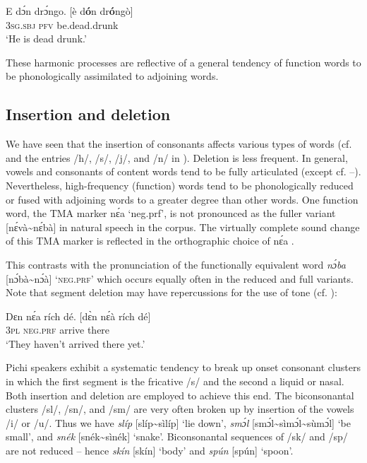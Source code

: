 \ea%
    \label{ex:key:37}
    \gll   E    dɔ́n    drɔ́ngo.          [è d\textbf{ó}n dr\textbf{ó}ngò]\\
\textsc{3sg.sbj}  \textsc{pfv}    be.dead.drunk\\

\glt ‘He is dead drunk.’
\z

These harmonic processes are reflective of a general tendency of function words to be phonologically assimilated to adjoining words. 

\subsection{Insertion and deletion}\label{sec:2.5.4}

We have seen that the insertion of consonants affects various types of words (cf.  and the entries /h/, /s/, /j/, and /n/ in ). Deletion is less frequent. In general, vowels and consonants of content words tend to be fully articulated (except cf. –). Nevertheless, high-frequency (function) words tend to be phonologically reduced or fused with adjoining words to a greater degree than other words. One function word, the TMA marker nɛ́a ‘neg.prf’, is not pronounced as the fuller variant [nɛ́và{\textasciitilde}nɛ́bà] in natural speech in the corpus. The virtually complete sound change of this TMA marker is reflected in the orthographic choice of nɛ́a . 


This contrasts with the pronunciation of the functionally equivalent word \textit{nɔ́ba} [nɔ́bà{\textasciitilde}nɔ́à] ‘\textsc{neg}.\textsc{prf}’ which occurs equally often in the reduced and full variants. Note that segment deletion may have repercussions for the use of tone (cf. ): 



\ea%
    \label{ex:key:38}
    \gll   Dɛn    nɛ́a    rích    dé.        [dɛ̀n    nɛ́à    rích    dé]\\
\textsc{3pl}    \textsc{neg}.\textsc{prf}  arrive  there\\

\glt ‘They haven’t arrived there yet.’
\z

Pichi speakers exhibit a systematic tendency to break up onset consonant clusters in which the first segment is the fricative /s/ and the second a liquid or nasal. Both insertion and deletion are employed to achieve this end. The biconsonantal clusters /sl/, /sn/, and /sm/ are very often broken up by insertion of the vowels /i/ or /u/. Thus we have \textit{slíp} [slíp{\textasciitilde}sìlíp] ‘lie down’, \textit{smɔ́l} [smɔ́l{\textasciitilde}sìmɔ́l{\textasciitilde}sùmɔ́l] ‘be small’, and \textit{snék} [snék{\textasciitilde}sìnék] ‘snake’. Biconsonantal sequences of /sk/ and /sp/ are not reduced – hence \textit{skín} [skín] ‘body’ and \textit{spún} [spún] ‘spoon’. 


